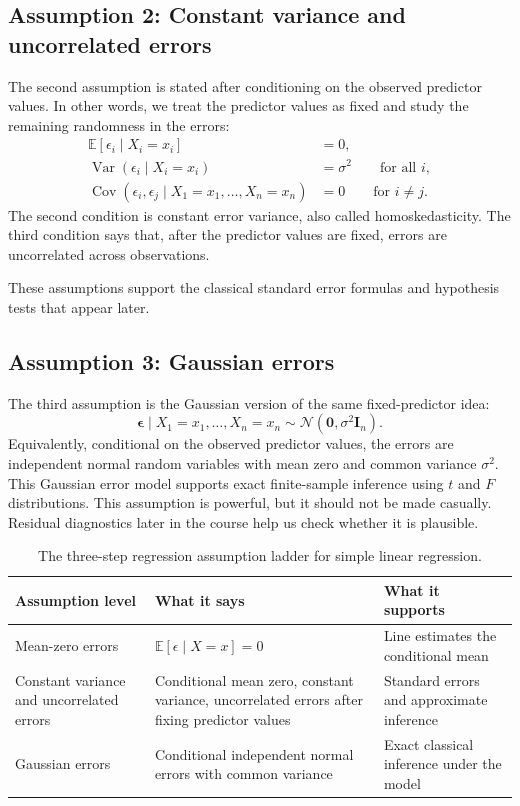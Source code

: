 \subsection{Assumption 2: Constant variance and uncorrelated errors}

The second assumption is stated after conditioning on the observed predictor values.  In other words, we treat the predictor values as fixed and study the remaining randomness in the errors:
\begin{align}
  \mathbb{E}[\epsilon_i\mid X_i=x_i]&=0, \\
  \operatorname{Var}(\epsilon_i\mid X_i=x_i)&=\sigma^2 \qquad \text{for all } i, \\
  \operatorname{Cov}(\epsilon_i,\epsilon_j\mid X_1=x_1,\ldots,X_n=x_n)&=0 \qquad \text{for } i\neq j.
\end{align}
The second condition is constant error variance, also called homoskedasticity.  The third condition says that, after the predictor values are fixed, errors are uncorrelated across observations.

These assumptions support the classical standard error formulas and hypothesis tests that appear later.

\subsection{Assumption 3: Gaussian errors}

The third assumption is the Gaussian version of the same fixed-predictor idea:
\begin{equation}
  \boldsymbol{\epsilon}\mid X_1=x_1,\ldots,X_n=x_n
  \sim \mathcal{N}(\mathbf{0},\sigma^2\mathbf{I}_n).
\end{equation}
Equivalently, conditional on the observed predictor values, the errors are independent normal random variables with mean zero and common variance \(\sigma^2\).  This Gaussian error model supports exact finite-sample inference using $t$ and $F$ distributions.  This assumption is powerful, but it should not be made casually.  Residual diagnostics later in the course help us check whether it is plausible.

\begin{table}[h]
\centering
\begin{tabular}{p{}p{}p{}}
\hline
Assumption level & What it says & What it supports \\
\hline
Mean-zero errors & $\mathbb{E}[\epsilon\mid X=x]=0$ & Line estimates the conditional mean \\
Constant variance and uncorrelated errors & Conditional mean zero, constant variance, uncorrelated errors after fixing predictor values & Standard errors and approximate inference \\
Gaussian errors & Conditional independent normal errors with common variance & Exact classical inference under the model \\
\hline
\end{tabular}
\caption{The three-step regression assumption ladder for simple linear regression.}
\label{tab:ch5-assumption-sets}
\end{table}

